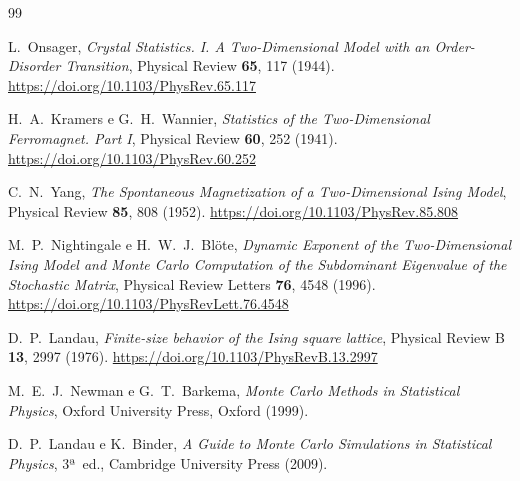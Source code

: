 \documentclass[12pt,a4paper]{article}
\begin{document}
\begin{thebibliography}{99}
 
L.~Onsager,
\textit{Crystal Statistics. I. A Two-Dimensional Model with an Order-Disorder Transition},
Physical Review \textbf{65}, 117 (1944).
\url{https://doi.org/10.1103/PhysRev.65.117}
 
H.~A.~Kramers e G.~H.~Wannier,
\textit{Statistics of the Two-Dimensional Ferromagnet. Part I},
Physical Review \textbf{60}, 252 (1941).
\url{https://doi.org/10.1103/PhysRev.60.252}
 
C.~N.~Yang,
\textit{The Spontaneous Magnetization of a Two-Dimensional Ising Model},
Physical Review \textbf{85}, 808 (1952).
\url{https://doi.org/10.1103/PhysRev.85.808}
 
M.~P.~Nightingale e H.~W.~J.~Blöte,
\textit{Dynamic Exponent of the Two-Dimensional Ising Model and Monte Carlo Computation
of the Subdominant Eigenvalue of the Stochastic Matrix},
Physical Review Letters \textbf{76}, 4548 (1996).
\url{https://doi.org/10.1103/PhysRevLett.76.4548}
 
D.~P.~Landau,
\textit{Finite-size behavior of the Ising square lattice},
Physical Review B \textbf{13}, 2997 (1976).
\url{https://doi.org/10.1103/PhysRevB.13.2997}
 
M.~E.~J.~Newman e G.~T.~Barkema,
\textit{Monte Carlo Methods in Statistical Physics},
Oxford University Press, Oxford (1999).
 
D.~P.~Landau e K.~Binder,
\textit{A Guide to Monte Carlo Simulations in Statistical Physics},
3ª~ed., Cambridge University Press (2009).

 
\end{thebibliography}
\end{document}
